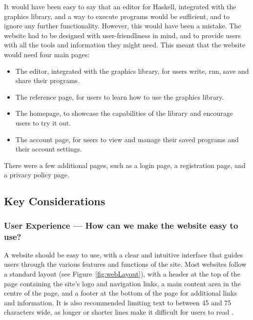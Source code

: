 \documentclass[../main.tex]{subfiles}
\begin{document}
            It would have been easy to say that an editor for Haskell, integrated with the
                graphics library, and a way to execute programs would be sufficient, and to
                ignore any further functionality.
            However, this would have been a mistake.
            The website had to be designed with user-friendliness in mind, and to provide
                users with all the tools and information they might need.
            This meant that the website would need four main pages:
            \begin{itemize}
                \item The editor, integrated with the graphics library, for users write, run, save
                      and share their programs.
                \item The reference page, for users to learn how to use the graphics library.
                \item The homepage, to showcase the capabilities of the library and encourage
                      users to try it out.
                \item The account page, for users to view and manage their saved programs and their
                      account settings.
            \end{itemize}
            There were a few additional pages, such as a login page, a registration page,
                and a privacy policy page.

        \subsection{Key Considerations}
            \subsubsection{User Experience — How can we make the website easy to use?}
                A website should be easy to use, with a clear and intuitive interface that
                    guides users through the various features and functions of the site.
                Most websites follow a standard layout (see Figure~\ref{fig:webLayout}), with a
                    header at the top of the page containing the site's logo and navigation links,
                    a main content area in the centre of the page, and a footer at the bottom of
                    the page for additional links and information.
                It is also recommended limiting text to between 45 and 75 characters wide, as
                    longer or shorter lines make it difficult for users to read \citep{lineLength}.
\end{document}
